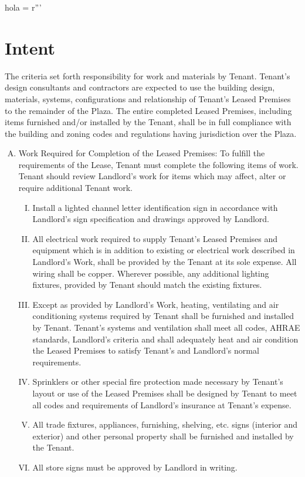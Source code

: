hola = r'''\documentclass{article}
\begin{document}
\section{Intent}
    The criteria set forth responsibility for work and materials by Tenant.  Tenant’s design consultants and contractors are expected to use the building design, materials, systems, configurations and relationship of Tenant’s Leased Premises to the remainder of the Plaza.  The entire completed Leased Premises, including items furnished and/or installed by the Tenant, shall be in full compliance with the building and zoning codes and regulations having jurisdiction over the Plaza.
    \begin{enumerate}[(A)]

    \item	 Work Required for Completion of the Leased Premises:  To fulfill the requirements of the Lease, Tenant must complete the following items of work.  Tenant should review Landlord’s work for items which may affect, alter or require additional Tenant work.
    
    \begin{enumerate}[(I)]
    \item	 Install a lighted channel letter identification sign in accordance with Landlord’s sign specification and drawings approved by Landlord.
    \item	All electrical work required to supply Tenant’s Leased Premises and equipment which is in addition to existing or electrical work described in Landlord’s Work, shall be provided by the Tenant at its sole expense.  All wiring shall be copper.  Wherever possible, any additional lighting fixtures, provided by Tenant should match the existing fixtures.
    \item	Except as provided by Landlord’s Work, heating, ventilating and air conditioning systems required by Tenant shall be furnished and installed by Tenant.  Tenant’s systems and ventilation shall meet all codes, AHRAE standards, Landlord’s criteria and shall adequately heat and air condition the Leased Premises to satisfy Tenant’s and Landlord’s normal requirements.
    \item	Sprinklers or other special fire protection made necessary by Tenant’s layout or use of the Leased Premises shall be designed by Tenant to meet all codes and requirements of Landlord’s insurance at Tenant’s expense.
    \item	All trade fixtures, appliances, furnishing, shelving, etc. signs (interior and exterior) and other personal property shall be furnished and installed by the Tenant.
    \item	All store signs must be approved by Landlord in writing.
    \end{enumerate}
    \end{enumerate}
\end{document}
